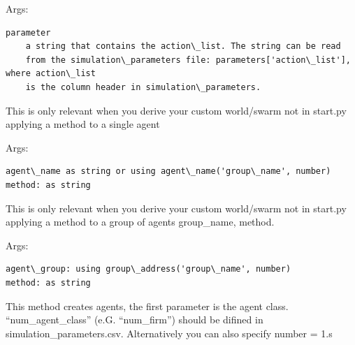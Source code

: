\documentclass[letterpaper,10pt,english]{sphinxmanual}
\begin{document}
\begin{fulllineitems}
\begin{fulllineitems}
Args:

\begin{Verbatim}[commandchars=\\\{\}]
parameter
    a string that contains the action\_list. The string can be read
    from the simulation\_parameters file: parameters['action\_list'], where action\_list
    is the column header in simulation\_parameters.
\end{Verbatim}

\end{fulllineitems}


\begin{fulllineitems}
\label{simulation:abce.Simulation.ask_agent}
This is only relevant when you derive your custom world/swarm not
in start.py
applying a method to a single agent

Args:

\begin{Verbatim}[commandchars=\\\{\}]
agent\_name as string or using agent\_name('group\_name', number)
method: as string
\end{Verbatim}

\end{fulllineitems}


\begin{fulllineitems}
\label{simulation:abce.Simulation.ask_each_agent_in}
This is only relevant when you derive your custom world/swarm not
in start.py
applying a method to a group of agents group\_name, method.

Args:

\begin{Verbatim}[commandchars=\\\{\}]
agent\_group: using group\_address('group\_name', number)
method: as string
\end{Verbatim}

\end{fulllineitems}


\begin{fulllineitems}
\label{simulation:abce.Simulation.build_agents}
This method creates agents, the first parameter is the agent class.
``num\_agent\_class'' (e.G. ``num\_firm'') should be difined in
simulation\_parameters.csv. Alternatively you can also specify number = 1.s


\end{fulllineitems}
\end{fulllineitems}
\end{document}
